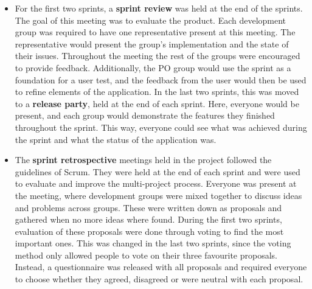 \begin{itemize}
\item For the first two sprints, a \textbf{sprint review} was held at the end of the sprints. The goal of this meeting was to evaluate the product. Each development group was required to have one representative present at this meeting. The representative would present the group's implementation and the state of their issues. Throughout the meeting the rest of the groups were encouraged to provide feedback. Additionally, the PO group would use the sprint as a foundation for a user test, and the feedback from the user would then be used to refine elements of the application.
In the last two sprints, this was moved to a \textbf{release party}, held at the end of each sprint. Here, everyone would be present, and each group would demonstrate the features they finished throughout the sprint. This way, everyone could see what was achieved during the sprint and what the status of the application was.

\item The \textbf{sprint retrospective} meetings held in the project followed the guidelines of Scrum. They were held at the end of each sprint and were used to evaluate and improve the multi-project process. Everyone was present at the meeting, where development groups were mixed together to discuss ideas and problems across groups. These were written down as proposals and gathered when no more ideas where found. During the first two sprints, evaluation of these proposals were done through voting to find the most important ones. 
This was changed in the last two sprints, since the voting method only allowed people to vote on their three favourite proposals. Instead, a questionnaire was released with all proposals and required everyone to choose whether they agreed, disagreed or were neutral with each proposal.
\end{itemize}


